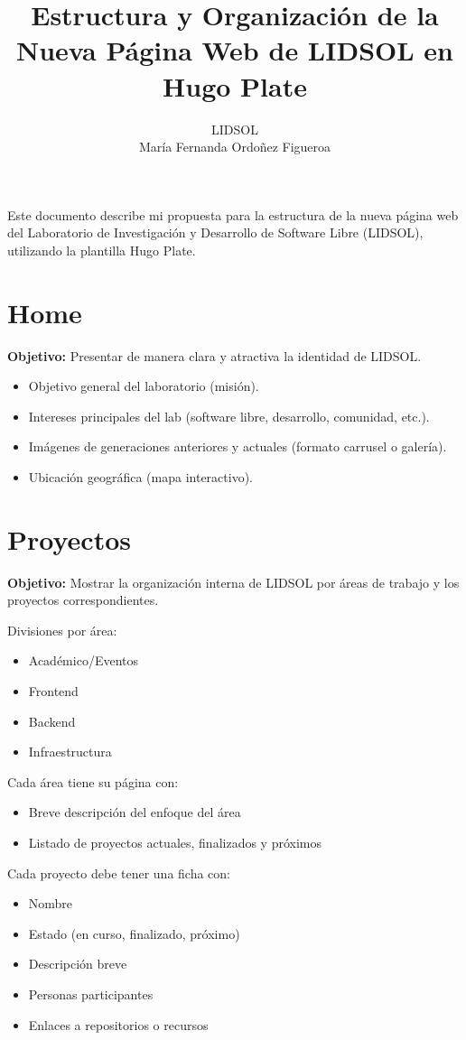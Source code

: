 \documentclass[12pt]{article}
\title{Estructura y Organización de la Nueva Página Web de LIDSOL en Hugo Plate}
\author{LIDSOL \\ María Fernanda Ordoñez Figueroa}
\date{}
\begin{document}
\maketitle

Este documento describe mi propuesta para la estructura de la nueva página web del
Laboratorio de Investigación y Desarrollo de Software Libre (LIDSOL), utilizando la plantilla
Hugo Plate.

\section{Home}
\textbf{Objetivo:} Presentar de manera clara y atractiva la identidad de LIDSOL.
\begin{itemize}[label=--]
    \item Objetivo general del laboratorio (misión).
    \item Intereses principales del lab (software libre, desarrollo, comunidad, etc.).
    \item Imágenes de generaciones anteriores y actuales (formato carrusel o galería).
    \item Ubicación geográfica (mapa interactivo).
\end{itemize}

\section{Proyectos}
\textbf{Objetivo:} Mostrar la organización interna de LIDSOL por áreas de trabajo y los proyectos correspondientes.

Divisiones por área:
\begin{itemize}
    \item Académico/Eventos
    \item Frontend
    \item Backend
    \item Infraestructura
\end{itemize}

Cada área tiene su página con:
\begin{itemize}[label=--]
    \item Breve descripción del enfoque del área
    \item Listado de proyectos actuales, finalizados y próximos
\end{itemize}

Cada proyecto debe tener una ficha con:
\begin{itemize}[label=--]
    \item Nombre
    \item Estado (en curso, finalizado, próximo)
    \item Descripción breve
    \item Personas participantes
    \item Enlaces a repositorios o recursos
\end{itemize}
\end{document}
